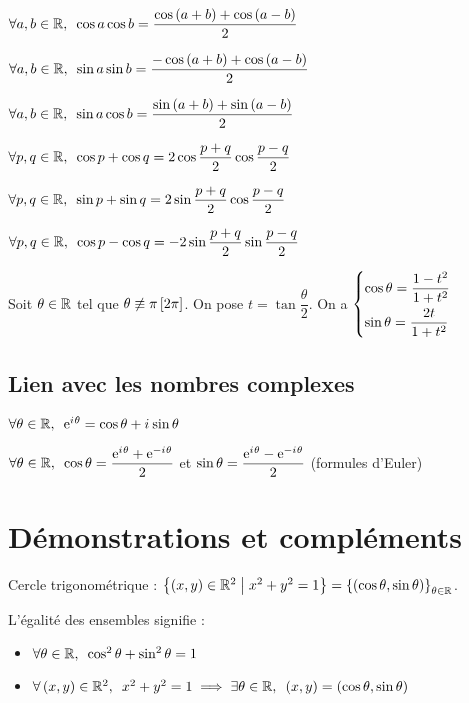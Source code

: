 \(\quantifs{\forall a,b\in\R}\cos a\cos b=\dfrac{\cos\paren{a+b}+\cos\paren{a-b}}{2}\)

\(\quantifs{\forall a,b\in\R}\sin a\sin b=\dfrac{-\cos\paren{a+b}+\cos\paren{a-b}}{2}\)

\(\quantifs{\forall a,b\in\R}\sin a\cos b=\dfrac{\sin\paren{a+b}+\sin\paren{a-b}}{2}\)

\(\quantifs{\forall p,q\in\R}\cos p+\cos q=2\cos\dfrac{p+q}{2}\cos\dfrac{p-q}{2}\)

\(\quantifs{\forall p,q\in\R}\sin p+\sin q=2\sin\dfrac{p+q}{2}\cos\dfrac{p-q}{2}\)

\(\quantifs{\forall p,q\in\R}\cos p-\cos q=-2\sin\dfrac{p+q}{2}\sin\dfrac{p-q}{2}\)

Soit \(\theta\in\mathbb{R}\) tel que \(\theta\not\equiv\pi\left[2\pi\right]\). On pose \(t=\tan\dfrac{\theta}{2}\). On a \(\begin{dcases}\cos\theta=\dfrac{1-t^2}{1+t^2} \\ \sin\theta=\dfrac{2t}{1+t^2}\end{dcases}\)

\subsection{Lien avec les nombres complexes}

\(\quantifs{\forall\theta\in\R}\e{\i\theta}=\cos\theta+\i\sin\theta\)

\(\quantifs{\forall\theta\in\R}\cos\theta=\dfrac{\e{\i\theta}+\e{-\i\theta}}{2}\) et \(\sin\theta=\dfrac{\mathrm{e}^{i\mkern1mu\theta}-\mathrm{e}^{-i\mkern1mu\theta}}{2}\) (formules d'Euler)

\section{Démonstrations et compléments}

Cercle trigonométrique : \(\left\lbrace\left(x,y\right)\in\mathbb{R}^2\;\middle|\; x^2+y^2=1\right\rbrace=\left\lbrace\left(\cos\theta,\sin\theta\right)\right\rbrace_{\theta\in\mathbb{R}}\).

\begin{rem}
L'égalité des ensembles signifie :

\begin{itemize}
\item[\increc] \(\quantifs{\forall\theta\in\R}\cos^2\theta+\sin^2\theta=1\)

\item[\incdir] \(\quantifs{\forall\paren{x,y}\in\R^2}x^2+y^2=1\imp\quantifs{\exists\theta\in\R}\paren{x,y}=\paren{\cos\theta,\sin\theta}\)
\end{itemize}
\end{rem}

